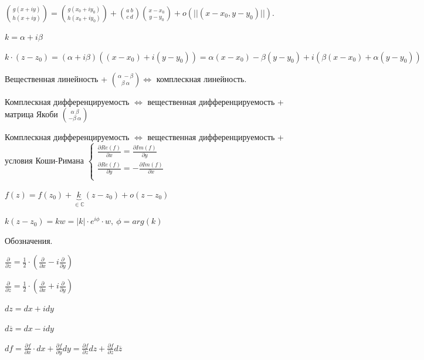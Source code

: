 \begin{remark}
    $\binom{g(x + iy)}{h(x + iy)} = \binom{g(x_0 + i y_0)}{h(x_0 + iy_0)} + \binom{a \ b}{c \ d} \binom{x - x_0}{y - y_0} + o(|| (x - x_0, y - y_0) ||)$.

    $k = \alpha + i \beta$

    $k \cdot (z - z_0) = (\alpha + i \beta) ( (x - x_0) + i (y - y_0)) = \alpha(x - x_0) - \beta(y - y_0) + i (\beta (x - x_0) + \alpha (y - y_0))$

    Вещественная линейность + $\binom{\alpha \ -\beta}{\beta \ \alpha} \Leftrightarrow$ комплескная линейность.
\end{remark}



\begin{remark}
    Комплескная дифференцируемость $\Leftrightarrow$ вещественная дифференцируемость + матрица Якоби $\binom{\alpha \ \beta}{-\beta \ \alpha}$

    
    Комплескная дифференцируемость $\Leftrightarrow$ вещественная дифференцируемость + условия Коши-Римана $
    \begin{cases}
        \frac{\partial Re(f)}{\partial x} = \frac{\partial Im (f)}{\partial y} \\ 
        \frac{\partial Re(f)}{\partial y} = -\frac{\partial Im (f)}{\partial x} \\ 
    \end{cases}
    $
\end{remark}
\begin{remark}
    $f(z) = f(z_0) + \underbrace{k}_{\in \mathbb{C}} (z - z_0) + o(z - z_0)$

    $k (z - z_0) = k w = |k| \cdot e^{i \phi} \cdot w, \ \phi = arg(k)$
\end{remark}


\begin{remark}
    Обозначения.

    $\frac{\partial}{\partial z} = \frac{1}{2} \cdot \left( \frac{\partial}{\partial x} - i \frac{\partial}{\partial y} \right)$
    
    $\frac{\partial}{\partial \overline{z}} = \frac{1}{2} \cdot \left( \frac{\partial}{\partial x} + i \frac{\partial}{\partial y} \right)$

    $dz = dx + i dy$

    $d \overline{z} = dx - i dy$

    $df = \frac{\partial f}{\partial x} \cdot dx + \frac{\partial f}{\partial y} dy = \frac{\partial f}{\partial z} dz + \frac{\partial f}{\partial \overline{z}} d \overline{z}$
\end{remark}

